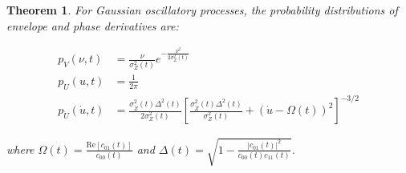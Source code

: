 \documentclass{article}
\newtheorem{theorem}{Theorem}
\begin{document}
\begin{theorem}
  For Gaussian oscillatory processes, the probability distributions of
  envelope and phase derivatives are:
  
  \begin{align}
    p_V (\nu, t) & = \frac{\nu}{\sigma_Z^2 (t)} e^{- \frac{\nu^2}{2 \sigma_Z^2
    (t)}} \\
    p_U (u, t) & = \frac{1}{2 \pi} \\
    p_{\dot{U}} (\dot{u}, t) & = \frac{\sigma_{\dot{Z}}^2 (t) \Delta^2 (t)}{2
    \sigma_Z^2 (t)}  \left[ \frac{\sigma_{\dot{Z}}^2 (t) \Delta^2
    (t)}{\sigma_Z^2 (t)} + (\dot{u} - \Omega (t))^2 \right]^{- 3 / 2} 
  \end{align}
  
  where $\Omega (t) = \frac{\text{Re} [c_{01} (t)]}{c_{00} (t)}$ and $\Delta
  (t) = \sqrt{1 - \frac{|c_{01} (t) |^2}{c_{00} (t) c_{11} (t)}}$.
\end{theorem}
\end{document}
